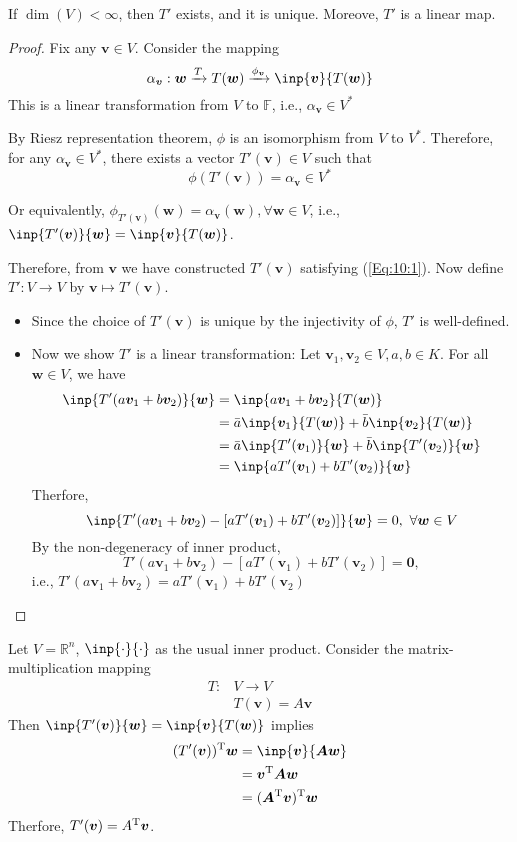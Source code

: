 \begin{proposition}
If $\dim(V)<\infty$, then $T'$ exists, and it is unique.
Moreove, $T'$ is a linear map.
\end{proposition}

\begin{proof}
Fix any $\bm v\in V$. Consider the mapping
\[
\alpha_{\bm v}: \bm w\xrightarrow{T}T(\bm w)\xrightarrow{\phi_{\bm v}}\inp{\bm v}{T(\bm w)}
\]
This is a linear transformation from $V$ to $\mathbb{F}$, i.e., $\alpha_{\bm v}\in V^*$

By Riesz representation theorem, $\phi$ is an isomorphism from $V$ to $V^*$. 
Therefore, for any $\alpha_{\bm v}\in V^*$, 
there exists a vector $T'(\bm v)\in V$ such that
\[
\phi(T'(\bm v))=\alpha_{\bm v}\in V^*
\]

Or equivalently, $\phi_{T'(\bm v)}(\bm w)=\alpha_{\bm v}(\bm w),\forall \bm w\in V$, i.e., $\inp{T'(\bm v)}{\bm w}=\inp{\bm v}{T(\bm w)}$.

Therefore, from $\bm v$ we have constructed $T'(\bm v)$ satisfying (\ref{Eq:10:1}).
Now define $T':V\to V$ by $\bm v\mapsto T'(\bm v)$.

\begin{itemize}
\item
Since the choice of $T'(\bm v)$ is unique by the injectivity of $\phi$, $T'$ is well-defined.
\item
Now we show $T'$ is a linear transformation:
Let $\bm v_1,\bm v_2\in V,a,b\in K$. For all $\bm w\in V$, we have
\begin{align*}
\inp{T'(a\bm v_1+b\bm v_2)}{\bm w}&=\inp{a\bm v_1+b\bm v_2}{T(\bm w)}\\
&=\bar{a}\inp{\bm v_1}{T(\bm w)}+\bar{b}\inp{\bm v_2}{T(\bm w)}\\
&=\bar{a}\inp{T'(\bm v_1)}{\bm w}+\bar{b}\inp{T'(\bm v_2)}{\bm w}\\
&=\inp{aT'(\bm v_1)+bT'(\bm v_2)}{\bm w}
\end{align*}
Therfore,
\[
\inp{T'(a\bm v_1+b\bm v_2) - [aT'(\bm v_1)+bT'(\bm v_2)]}{\bm w}=0,\ \forall \bm w\in V
\]
By the non-degeneracy of inner product,
\[
T'(a\bm v_1+b\bm v_2) - [aT'(\bm v_1)+bT'(\bm v_2)]=\bm0,
\]
i.e., $T'(a\bm v_1+b\bm v_2)=aT'(\bm v_1)+bT'(\bm v_2)$
\end{itemize}
\end{proof}


\begin{example}
Let $V=\mathbb{R}^n$, $\inp{\cdot}{\cdot}$ as the usual inner product. Consider the matrix-multiplication mapping
\[
\begin{array}{ll}
T:&V\to V\\
&T(\bm v)=A\bm v
\end{array}
\]
Then $\inp{T'(\bm v)}{\bm w}=\inp{\bm v}{T(\bm w)}$ implies
\begin{align*}
(T'(\bm v))\trans\bm w&=\inp{\bm v}{\bm A\bm w}\\
&=\bm v\trans\bm A\bm w\\
&=(\bm A\trans\bm v)\trans\bm w
\end{align*}
Therfore, $T'(\bm v) = A^{\mathrm T}\bm v$.
\end{example}

